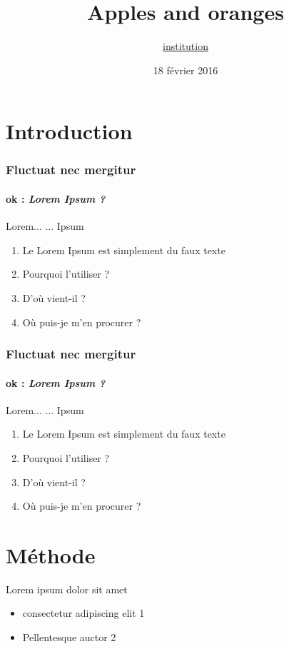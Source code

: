 \documentclass{beamer}
\title{Apples and oranges}
\date[18022016]{18 février 2016}
\author[GPR]{\href{www.aphp.fr}{institution}}
\begin{document}
\begin{frame}
\titlepage
\end{frame}

\section{Introduction}\label{introduction}

\begin{frame} 
\frametitle{Fluctuat nec mergitur}
\framesubtitle{ok : \textit{Lorem Ipsum ?}} 
\begin{block}{Lorem...}
... Ipsum\end{block} 
\begin{enumerate} 
\item<1-| alert@1> Le Lorem Ipsum est simplement du faux texte
\item<2-> Pourquoi l'utiliser ?
\item<3-> D'où vient-il ?
\item<4-> Où puis-je m'en procurer ?
\end{enumerate}
\end{frame}

\begin{frame}
\frametitle{Fluctuat nec mergitur}
\framesubtitle{ok : \textit{Lorem Ipsum ?}} 
\begin{block}{Lorem...}
... Ipsum\end{block} 
\begin{enumerate} 
\item<1-> Le Lorem Ipsum est simplement du faux texte
\item<2-> Pourquoi l'utiliser ?
\item<3-> D'où vient-il ?
\item<4-> Où puis-je m'en procurer ?
\end{enumerate}
\end{frame}

\section{Méthode}\label{Méthode}

\begin{frame}{Lorem ipsum dolor sit amet}
\begin{itemize}
\item consectetur adipiscing elit 1
\item Pellentesque auctor 2
\end{itemize}
\end{frame}
\end{document}
